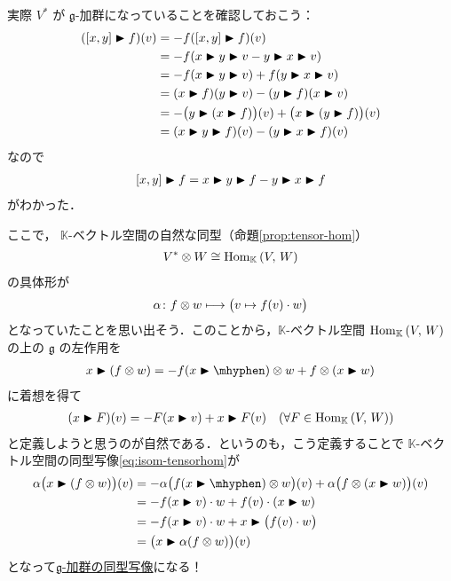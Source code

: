 \documentclass[rep_main]{subfiles}
\begin{document}
実際 $V^*$ が $\mathfrak{g}$-加群になっていることを確認しておこう：
\begin{align}
	(\comm{x}{y} \btr f)(v)
	&= - f(\comm{x}{y} \btr f)(v) \\
	&= - f(x \btr y \btr v - y \btr x \btr v) \\
	&= - f(x \btr y \btr v)  + f(y \btr x \btr v) \\
	&= (x \btr f)(y \btr v) - (y \btr f)(x \btr v) \\
	&= -\bigl( y \btr (x \btr f) \bigr) (v) + \bigl( x \btr (y \btr f) \bigr) (v) \\
	&= (x \btr y \btr f)(v) - (y \btr x \btr f)(v)
\end{align}
なので
\begin{align}
	\comm{x}{y} \btr f = x \btr y \btr f - y \btr x \btr f
\end{align}
がわかった．

ここで， $\mathbb{K}$-ベクトル空間の自然な同型（命題\ref{prop:tensor-hom}）
\begin{align}
	V^* \otimes W \cong \mathrm{Hom}_{\mathbb{K}} \mathop{}(V,\, W)
\end{align}
の具体形が
\begin{align}
	\label{eq:isom-tensorhom}
	\alpha \colon f \otimes w \longmapsto \bigl( v \mapsto f(v) \cdot w  \bigr) 
\end{align}
となっていたことを思い出そう．このことから，$\mathbb{K}$-ベクトル空間 $\mathrm{Hom}_{\mathbb{K}} \mathop{}(V,\, W)$ の上の $\mathfrak{g}$ の左作用を
\begin{align}
	x \btr (f \otimes w) = - f (x \btr \mhyphen) \otimes w + f \otimes (x \btr w)
\end{align}
に着想を得て
\begin{align}
	(x \blacktriangleright F)(v) = - F(x \blacktriangleright v) + x \blacktriangleright F(v)\quad (\forall F \in \mathrm{Hom}_{\mathbb{K}} \mathop{}(V,\, W))
\end{align}
と定義しようと思うのが自然である．というのも，こう定義することで $\mathbb{K}$-ベクトル空間の同型写像\eqref{eq:isom-tensorhom}が
\begin{align}
	\alpha \bigl( x \btr (f \otimes w) \bigr) (v)
	&= - \alpha \bigl(f (x \btr \mhyphen) \otimes w\bigr)(v) + \alpha \bigl( f \otimes (x \btr w) \bigr)(v) \\
	&= - f (x \btr v)\cdot w + f(v) \cdot (x \btr w) \\
	&= - f (x \btr v)\cdot w + x \btr \bigl( f(v) \cdot w \bigr) \\
	&= \bigl(x \btr \alpha (f \otimes w) \bigr)(v)
\end{align}
となって\hyperref[def:g-module-hom]{$\mathfrak{g}$-加群の同型写像}になる！
\end{document}
